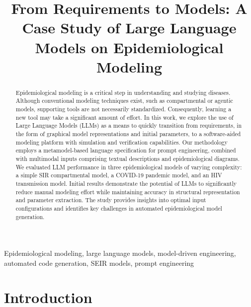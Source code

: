 \documentclass[conference]{IEEEtran}
\begin{document}
\title{From Requirements to Models: A Case Study of Large Language Models on Epidemiological Modeling
}

\author{
}

\maketitle

\begin{abstract}
Epidemiological modeling is a critical step in understanding and studying diseases. Although conventional modeling techniques exist, such as compartmental or agentic models, supporting tools are not necessarily standardized. Consequently, learning a new tool may take a significant amount of effort. In this work, we explore the use of Large Language Models (LLMs) as a means to quickly transition from requirements, in the form of graphical model representations and initial parameters, to a software-aided modeling platform with simulation and verification capabilities. Our methodology employs a metamodel-based language specification for prompt engineering, combined with multimodal inputs comprising textual descriptions and epidemiological diagrams. We evaluated LLM performance in three epidemiological models of varying complexity: a simple SIR compartmental model, a COVID-19 pandemic model, and an HIV transmission model. Initial results demonstrate the potential of LLMs to significantly reduce manual modeling effort while maintaining accuracy in structural representation and parameter extraction. The study provides insights into optimal input configurations and identifies key challenges in automated epidemiological model generation.
\end{abstract}

\begin{IEEEkeywords}
Epidemiological modeling, large language models, model-driven engineering, automated code generation, SEIR models, prompt engineering
\end{IEEEkeywords}

\section{Introduction}
\end{document}
